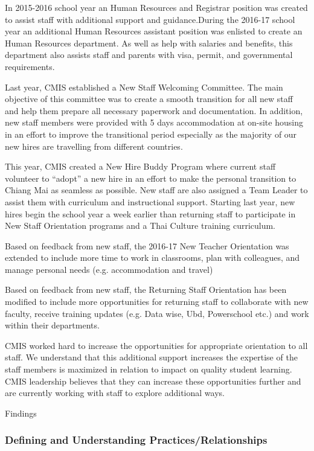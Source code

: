 \begin{findings}
In 2015-2016 school year an Human Resources and Registrar position was created to assist staff with additional support  and guidance.During the 2016-17 school year an additional Human Resources assistant position was enlisted to create an Human Resources department. As well as help with salaries and benefits, this department also assists staff and parents with visa, permit, and governmental requirements.

Last year, CMIS established a New Staff Welcoming Committee. The main objective of this committee  was to create a smooth transition for all new staff and help them prepare all necessary paperwork and documentation. In addition, new staff members were provided with 5 days accommodation at on-site housing in an effort to improve the transitional period especially as the majority of our new hires are travelling from different countries.

This year, CMIS created a New Hire Buddy Program where current staff volunteer to “adopt” a new hire in an effort to make the personal transition to Chiang Mai as seamless as possible. New staff  are also assigned a Team Leader to assist them with curriculum and instructional support. Starting last year, new hires begin the school year a week earlier than returning staff to participate in New Staff Orientation programs and a Thai Culture training curriculum.

Based on feedback from new staff, the 2016-17 New Teacher Orientation was extended to include more time to work in classrooms, plan with colleagues, and manage personal needs (e.g. accommodation and travel)

Based on feedback from new staff, the Returning Staff Orientation has been modified to include  more opportunities for returning staff to collaborate with new faculty, receive training updates (e.g. Data wise, Ubd, Powerschool etc.) and work within their departments.


CMIS worked hard to increase the opportunities for appropriate orientation to all staff. We understand that this additional support increases the expertise of the staff members is maximized in relation to impact on quality student learning. CMIS leadership believes that they can increase these opportunities further and are currently working with staff to explore additional ways.
\end{findings}Findings

\subsubsection{Defining and Understanding Practices/Relationships}

